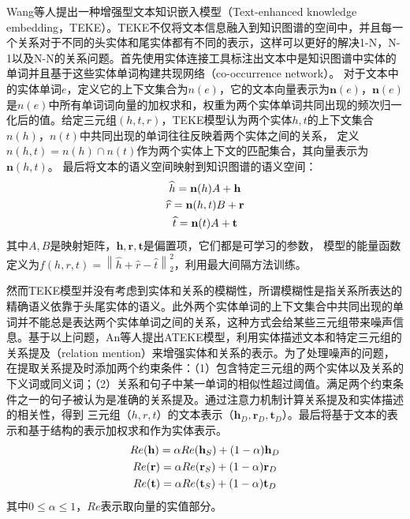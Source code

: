 \documentclass[twocolumn]{article}
\newcommand{\upcite}[1]{\textsuperscript{\textsuperscript{\cite{#1}}}}
\begin{document}
	Wang等人\upcite{TEKE}提出一种增强型文本知识嵌入模型（Text-enhanced knowledge embedding，TEKE）。TEKE不仅将文本信息融入到知识图谱的空间中，并且每一个关系对于不同的头实体和尾实体都有不同的表示，这样可以更好的解决1-N，N-1以及N-N的关系问题。首先使用实体连接工具标注出文本中是知识图谱中实体的单词并且基于这些实体单词构建共现网络（co-occurrence network）。
	对于文本中的实体单词$e$，定义它的上下文集合为$n(e)$，它的文本向量表示为$\textbf{n}(e)$，$\textbf{n}(e)$是$n(e)$中所有单词词向量的加权求和，权重为两个实体单词共同出现的频次归一化后的值。给定三元组$(h,t,r)$，TEKE模型认为两个实体$h,t$的上下文集合$n(h)$，$n(t)$中共同出现的单词往往反映着两个实体之间的关系，
	定义$n(h,t)=n(h)\cap n(t)$作为两个实体上下文的匹配集合，其向量表示为$\textbf{n}(h,t)$。
	最后将文本的语义空间映射到知识图谱的语义空间：
	\begin{gather}
		\widehat{h}=\textbf{n}(h)A+\textbf{h} \notag \\
		\widehat{r}=\textbf{n}(h,t)B+\textbf{r} \\
		\widehat{t}=\textbf{n}(t)A+\textbf{t} \notag
	\end{gather}
	其中$A,B$是映射矩阵，$\textbf{h},\textbf{r},\textbf{t}$是偏置项，它们都是可学习的参数，
	模型的能量函数定义为$f(h,r,t)=\left \|\widehat{h}+\widehat{r}-\widehat{t}\right \|_2^2$，利用最大间隔方法训练。
	
	然而TEKE模型并没有考虑到实体和关系的模糊性，所谓模糊性是指关系所表达的精确语义依靠于头尾实体的语义。此外两个实体单词的上下文集合中共同出现的单词并不能总是表达两个实体单词之间的关系，这种方式会给某些三元组带来噪声信息。基于以上问题，An等人\upcite{ATEKE}提出ATEKE模型，利用实体描述文本和特定三元组的关系提及（relation mention）来增强实体和关系的表示。为了处理噪声的问题，在提取关系提及时添加两个约束条件：（1）包含特定三元组的两个实体以及关系的下义词或同义词；（2）关系和句子中某一单词的相似性超过阈值。满足两个约束条件之一的句子被认为是准确的关系提及。通过注意力机制计算关系提及和实体描述的相关性，得到
	三元组（$h,r,t$）的文本表示（$\textbf{h}_D,\textbf{r}_D,\textbf{t}_D$）。最后将基于文本的表示和基于结构的表示加权求和作为实体表示。
	\begin{gather}
		Re(\textbf{h})=\alpha Re(\textbf{h}_{S})+(1-\alpha)\textbf{h}_D \notag \\
		Re(\textbf{r})=\alpha Re(\textbf{r}_{S})+(1-\alpha)\textbf{r}_D \notag \\
		Re(\textbf{t})=\alpha Re(\textbf{t}_{S})+(1-\alpha)\textbf{t}_D \notag
	\end{gather}
	其中$0\leq \alpha \leq 1$，$Re$表示取向量的实值部分。
\end{document}
